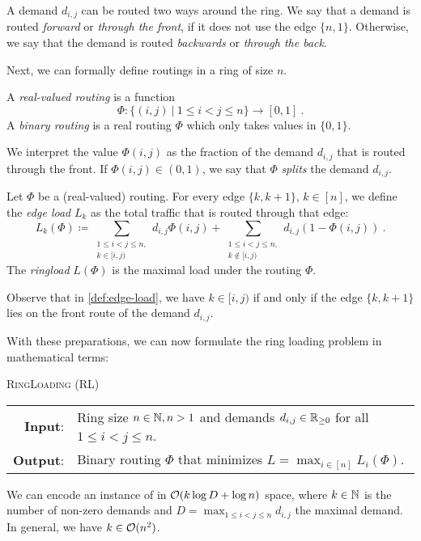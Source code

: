 A demand $d_{i, j}$ can be routed two ways around the ring.
We say that a demand is routed \emph{forward} or \emph{through the front}, if it does not use the edge $\{n, 1\}$.
Otherwise, we say that the demand is routed \emph{backwards} or \emph{through the back}.

Next, we can formally define routings in a ring of size $n$.
\begin{definition}[Routing]
	\label{def:routing}
	A \emph{real-valued routing} is a function 
	\begin{equation}
		\Phi: \{(i, j)\ | \ 1 \leq i < j \leq n\} \rightarrow [0, 1] \ .
	\end{equation}
	A \emph{binary routing} is a real routing $\Phi$ which only takes values in $\{0, 1\}$. 
\end{definition}
We interpret the value $\Phi(i, j)$ as the fraction of the demand $d_{i, j}$ that is routed through the front.
If $\Phi(i, j) \in (0, 1)$, we say that $\Phi$ \emph{splits} the demand $d_{i, j}$.

\begin{definition}
	\label{def:edge-load}
	Let $\Phi$ be a (real-valued) routing.
	For every edge $\{k, k+1\}$, $k \in [n]$, we define the \emph{edge load} $L_k$ as the total traffic that is routed through that edge:
	\begin{equation}
		\label{eq:edge-load}
		L_k(\Phi) \coloneqq \sum_{\substack{1 \leq i < j \leq n,\\ k \in [i, j)}} d_{i, j} \Phi(i, j) + \sum_{\substack{1 \leq i < j \leq n,\\ k \notin [i, j)}} d_{i, j} (1 - \Phi(i, j)) \ .
	\end{equation}
	The \emph{ringload} $L(\Phi)$ is the maximal load under the routing $\Phi$.
\end{definition}
Observe that in \cref{def:edge-load}, we have $k \in [i, j)$ if and only if the edge $\{k, k+1\}$ lies on the front route of the demand $d_{i, j}$.

With these preparations, we can now formulate the ring loading problem in mathematical terms:
\begin{center}
	\begin{mdframed}
		\centering
		\textsc{RingLoading} (\textsc{RL})\\[0.7em]
		\begin{tabular}{rl}
			{\bfseries Input}: & Ring size $n \in \mathbb{N}, n > 1$ and demands $d_{i, j} \in \mathbb{R}_{\geq 0}$ for all $1 \leq i<j\leq n$.\\
			{\bfseries Output}: & Binary routing $\Phi$ that minimizes $L = \max_{i \in [n]} L_i(\Phi)$.
		\end{tabular}
	\end{mdframed}
\end{center}
We can encode an instance of \RL in $\mathcal{O}(k \log D + \log n)$ space, where $k \in \mathbb{N}$ is the number of non-zero demands and $D = \max_{1 \leq i < j \leq n}d_{i, j}$ the maximal demand.
In general, we have $k \in \mathcal{O}(n^2)$.

